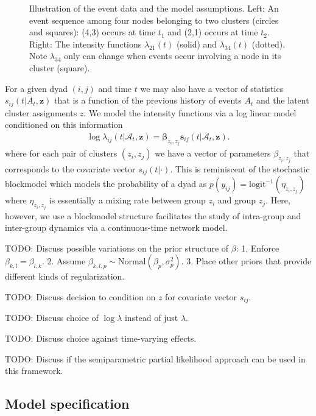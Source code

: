 \documentclass[11pt]{article}
\begin{document}
\begin{figure}
 \def\svgwidth{6in}
  
\caption{Illustration of the event data and the model assumptions.  Left: An event sequence among four nodes belonging to two clusters (circles and squares): (4,3) occurs at time $t_1$ and (2,1) occurs at time $t_2$.  Right: The intensity functions $\lambda_{21}(t)$ (solid) and $\lambda_{34}(t)$ (dotted).  Note $\lambda_{34}$ only can change when events occur involving a node in its cluster (square).}
\label{fig:example}
\end{figure}

For a given dyad $(i,j)$ and time $t$ we may also have a vector of statistics $s_{ij}(t|A_t,\mathbf{z})$ that is a function of the previous history of events $A_t$ and the latent cluster assignments $z$.  We model the intensity functions via a log linear model conditioned on this information
\begin{align}
\log \lambda_{ij}(t | \mathcal{A}_t,\mathbf{z}) = \boldsymbol{\beta}_{z_i,z_j} \mathbf{s}_{ij}(t|\mathcal{A}_t,\mathbf{z}).
\end{align}
where for each pair of clusters $(z_i,z_j)$ we have a vector of parameters $\beta_{z_i,z_j}$ that corresponds to the covariate vector $s_{ij}(t|\cdot)$.  This is reminiscent of the stochastic blockmodel \cite{Nowicki2001, Kemp2006} which models the probability of a dyad as $p(y_{ij}) =\mbox{logit}^{-1}( \eta_{z_i,z_j})$ where $\eta_{z_i,z_j}$ is essentially a mixing rate between group $z_i$ and group $z_j$.  Here, however, we use a blockmodel structure facilitates the study of intra-group and inter-group dynamics via a continuous-time network model.

TODO: Discuss possible variations on the prior structure of $\beta$: 1. Enforce $\beta_{k,l} = \beta_{l,k}$. 2. Assume $\beta_{k,l,p} \sim \mbox{Normal}(\beta_p,\sigma_p^2)$. 3. Place other priors that provide different kinds of regularization. 

TODO: Discuss decision to condition on $z$ for covariate vector $s_{ij}$.

TODO: Discuss choice of $\log \lambda$ instead of just $\lambda$.

TODO: Discuss choice against time-varying effects.

TODO: Discuss if the semiparametric partial likelihood approach can be used in this framework.

\subsection{Model specification}
\end{document}

